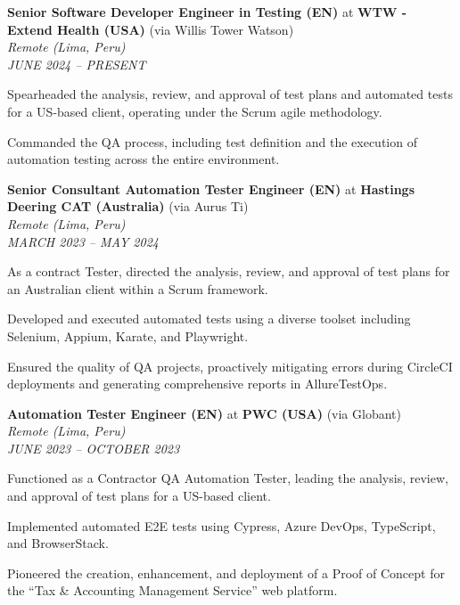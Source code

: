 
\item \label{job:wtw}
\textbf{Senior Software Developer Engineer in Testing (EN)} at \textbf{WTW - Extend Health (USA)} (via Willis Tower Watson) \\
\textit{Remote (Lima, Peru)} \\
\textit{JUNE 2024 -- PRESENT}
\resumeItemListStart
    \item Spearheaded the analysis, review, and approval of test plans and automated tests for a US-based client, operating under the Scrum agile methodology.
    \item Commanded the QA process, including test definition and the execution of automation testing across the entire environment.
\resumeItemListEnd

\item \label{job:aurus}
\textbf{Senior Consultant Automation Tester Engineer (EN)} at \textbf{Hastings Deering CAT (Australia)} (via Aurus Ti) \\
\textit{Remote (Lima, Peru)} \\
\textit{MARCH 2023 -- MAY 2024}
\resumeItemListStart
    \item As a contract Tester, directed the analysis, review, and approval of test plans for an Australian client within a Scrum framework.
    \item Developed and executed automated tests using a diverse toolset including Selenium, Appium, Karate, and Playwright.
    \item Ensured the quality of QA projects, proactively mitigating errors during CircleCI deployments and generating comprehensive reports in AllureTestOps.
\resumeItemListEnd

\item \label{job:globant}
\textbf{Automation Tester Engineer (EN)} at \textbf{PWC (USA)} (via Globant) \\
\textit{Remote (Lima, Peru)} \\
\textit{JUNE 2023 -- OCTOBER 2023}
\resumeItemListStart
    \item Functioned as a Contractor QA Automation Tester, leading the analysis, review, and approval of test plans for a US-based client.
    \item Implemented automated E2E tests using Cypress, Azure DevOps, TypeScript, and BrowserStack.
    \item Pioneered the creation, enhancement, and deployment of a Proof of Concept for the ``Tax \& Accounting Management Service'' web platform.
\resumeItemListEnd

